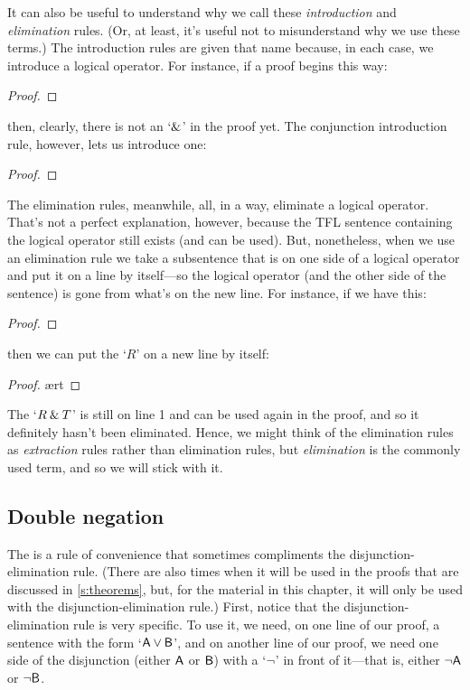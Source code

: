 It can also be useful to understand why we call these \textit{introduction} and \textit{elimination} rules. (Or, at least, it's useful not to misunderstand why we use these terms.) The introduction rules are given that name because, in each case, we introduce a logical operator. For instance, if a proof begins this way: 

\begin{proof}
	 \pr{}
	 \pr{}
\end{proof}

\noindent then, clearly, there is not an `$\mathbin{\&}$' in the proof yet. The conjunction introduction rule, however, lets us introduce one:

\begin{proof}
	 
\end{proof}

The elimination rules, meanwhile, all, in a way, eliminate a logical operator. That's not a perfect explanation, however, because the TFL sentence containing the logical operator still exists (and can be used). But, nonetheless, when we use an elimination rule we take a subsentence that is on one side of a logical operator and put it on a line by itself---so the logical operator (and the other side of the sentence) is gone from what's on the new line. For instance, if we have this:

\begin{proof}
	 \pr{}
\end{proof}

\noindent then we can put the `$R$' on a new line by itself:

\begin{proof}
	 \ae{rt}
\end{proof}

\noindent The `$R \mathbin{\&} T$' is still on line 1 and can be used again in the proof, and so it definitely hasn't been eliminated.  Hence, we might think of the elimination rules as \textit{extraction} rules rather than elimination rules, but \textit{elimination} is the commonly used term, and so we will stick with it. 


\subsection{Double negation}

The  is a rule of convenience that sometimes compliments the disjunction-elimination rule. (There are also times when it will be used in the proofs that are discussed in \ref{s:theorems}, but, for the material in this chapter, it will only be used with the disjunction-elimination rule.) First, notice that the disjunction-elimination rule is very specific. To use it, we need, on one line of our proof, a sentence with the form `$\mathsf{A}\vee\mathsf{B}$', and on another line of our proof, we need one side of the disjunction (either $\mathsf{A}$ or $\mathsf{B}$) with a `${\neg}$' in front of it---that is, either ${\neg}\mathsf{A}$ or ${\neg}\mathsf{B}$. 

